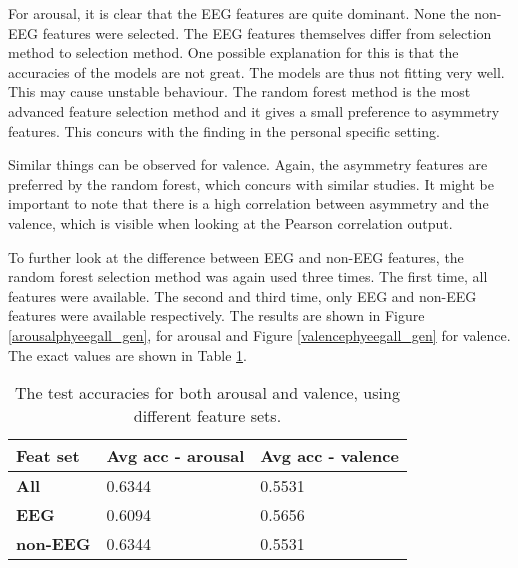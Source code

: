 For arousal, it is clear that the EEG features are quite dominant. None the non-EEG features were selected. The EEG features themselves differ from selection method to selection method. One possible explanation for this is that the accuracies of the models are not great. The models are thus not fitting very well. This may cause unstable behaviour. The random forest method is the most advanced feature selection method and it gives a small preference to asymmetry features. This concurs with the finding in the personal specific setting. 

\npar

Similar things can be observed for valence. Again, the asymmetry features are preferred by the random forest, which concurs with similar studies. It might be important to note that there is a high correlation between asymmetry and the valence, which is visible when looking at the Pearson correlation output.

\npar

To further look at the difference between EEG and non-EEG features, the random forest selection method was again used three times. The first time, all features were available. The second and third time, only EEG and non-EEG features were available respectively. The results are shown in Figure \ref{arousalphyeegall_gen}, for arousal and Figure \ref{valencephyeegall_gen} for valence. The exact values are shown in Table \ref{phyeegallgenTable}.




\begin{table}[H]
\centering
\begin{tabular}{l|ll}
\textbf{Feat set}  & \textbf{Avg acc - arousal}       & \textbf{Avg acc - valence}          \\ \hline
\textbf{All}       & 0.6344           & 0.5531           \\
\textbf{EEG}       & 0.6094           & 0.5656           \\
\textbf{non-EEG}   & 0.6344           & 0.5531          
\end{tabular}
\caption{The test accuracies for both arousal and valence, using different feature sets.\label{phyeegallgenTable}}
\end{table}

